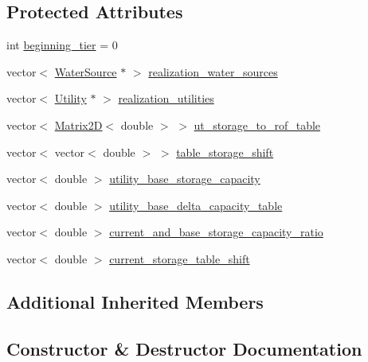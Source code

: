 \subsection*{Protected Attributes}
\begin{DoxyCompactItemize}
\item 
int \mbox{\hyperlink{classContinuityModelROF_ad0a8c47eca4ca66b58a2636ab907a4f2}{beginning\+\_\+tier}} = 0
\item 
vector$<$ \mbox{\hyperlink{classWaterSource}{Water\+Source}} $\ast$ $>$ \mbox{\hyperlink{classContinuityModelROF_a77048d247b8d1f70fbdd31559b4d3337}{realization\+\_\+water\+\_\+sources}}
\item 
vector$<$ \mbox{\hyperlink{classUtility}{Utility}} $\ast$ $>$ \mbox{\hyperlink{classContinuityModelROF_a75c6823d8dd37f274ee91ce158088dc4}{realization\+\_\+utilities}}
\item 
vector$<$ \mbox{\hyperlink{classMatrix2D}{Matrix2D}}$<$ double $>$ $>$ \mbox{\hyperlink{classContinuityModelROF_ada25d241caf860255ad00097f5e7adb6}{ut\+\_\+storage\+\_\+to\+\_\+rof\+\_\+table}}
\item 
vector$<$ vector$<$ double $>$ $>$ \mbox{\hyperlink{classContinuityModelROF_a1a90c8816944aab36f395e89f7b84c06}{table\+\_\+storage\+\_\+shift}}
\item 
vector$<$ double $>$ \mbox{\hyperlink{classContinuityModelROF_a6a429c37f019777325ea4e5b9ad26cae}{utility\+\_\+base\+\_\+storage\+\_\+capacity}}
\item 
vector$<$ double $>$ \mbox{\hyperlink{classContinuityModelROF_a017041335a639ba56cc3e26dea07b514}{utility\+\_\+base\+\_\+delta\+\_\+capacity\+\_\+table}}
\item 
vector$<$ double $>$ \mbox{\hyperlink{classContinuityModelROF_adcaf978b52ba016474952a42856ba373}{current\+\_\+and\+\_\+base\+\_\+storage\+\_\+capacity\+\_\+ratio}}
\item 
vector$<$ double $>$ \mbox{\hyperlink{classContinuityModelROF_a443efa8d5a8bcbb1fea1a0bc929c77cd}{current\+\_\+storage\+\_\+table\+\_\+shift}}
\end{DoxyCompactItemize}
\subsection*{Additional Inherited Members}


\subsection{Constructor \& Destructor Documentation}
\mbox{\label{classContinuityModelROF_a23bd422349e4e2246bd44b2007564fd1}} 
